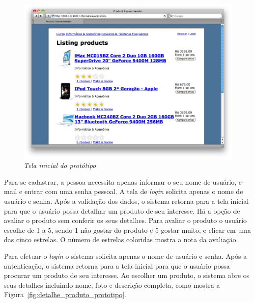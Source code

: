 \begin{figure}
  \centering
  \includegraphics[width=\textwidth]{imagens/Tela_Inicial_Prototipo}
  \caption{\it Tela inicial do protótipo}
  \label{fig:tela_inicial_prototipo}
\end{figure}

 Para se cadastrar, a pessoa necessita apenas informar o seu nome de usuário, e-mail e entrar com uma senha pessoal. A tela de \textit{login} solicita apenas o nome de usuário e senha. Após a validação dos dados, o sistema retorna para a tela inicial para que o usuário possa detalhar um produto de seu interesse. Há a opção de avaliar o produto sem conferir os seus detalhes. Para avaliar o produto o usuário escolhe de 1 a 5, sendo 1 não gostar do produto e 5 gostar muito, e clicar em uma das cinco estrelas. O número de estrelas coloridas mostra a nota da avaliação. 
 
 Para efetuar o \emph{login} o sistema solicita apenas o nome de usuário e senha. Após a autenticação, o sistema retorna para a tela inicial para que o usuário possa procurar um produto de seu interesse. Ao escolher um produto, o sistema abre os seus detalhes incluindo nome, foto e descrição completa, como mostra a Figura~\ref{fig:detalhe_produto_prototipo}.

